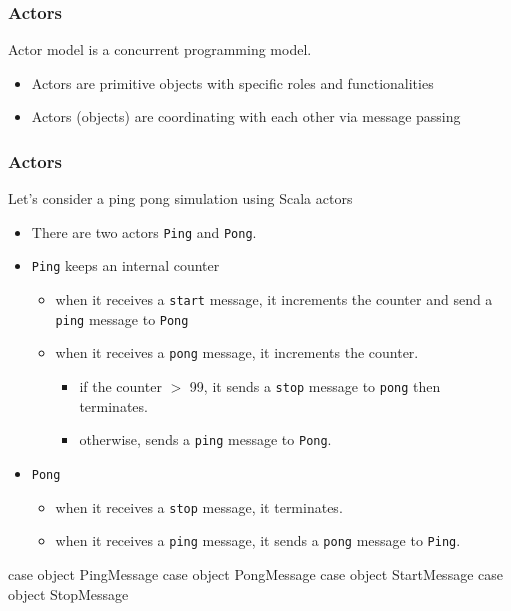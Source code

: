 \documentclass{beamer}
\newcommand{\beb}{\begin{exampleblock}}
\newcommand{\eeb}{\end{exampleblock}}
\begin{document}
\begin{frame}[fragile]
\frametitle{Actors}
Actor model is a concurrent programming model. 
\begin{itemize}
 \item Actors are primitive objects with specific roles and functionalities
 \item Actors (objects) are coordinating with each other via message passing
\end{itemize}
\end{frame}

\begin{frame}[fragile]
\frametitle{Actors}
Let's consider a ping pong simulation using Scala actors

\begin{itemize}
\item There are two actors {\tt Ping} and {\tt Pong}. 
\item {\tt Ping} keeps an internal counter
   \begin{itemize}
      \item when it receives a {\tt start} message, 
        it increments the counter and send a {\tt ping} message to {\tt Pong}
       \item when it receives a {\tt pong} message, it increments the
         counter. 
           \begin{itemize} 
               \item if the counter $>$ 99, it sends a {\tt stop}
                 message to {\tt pong} then terminates.
               \item  otherwise, sends a {\tt ping} message to {\tt Pong}.
           \end{itemize}
   \end{itemize}
\item {\tt Pong} 
  \begin{itemize}
    \item when it receives a {\tt stop} message, it terminates.
    \item when it receives a {\tt ping} message, it sends a {\tt pong}
      message to {\tt Ping}.
  \end{itemize}
\end{itemize}

\beb{}
\begin{code}
case object PingMessage
case object PongMessage
case object StartMessage
case object StopMessage
\end{code}
\eeb
\end{frame}
\end{document}
